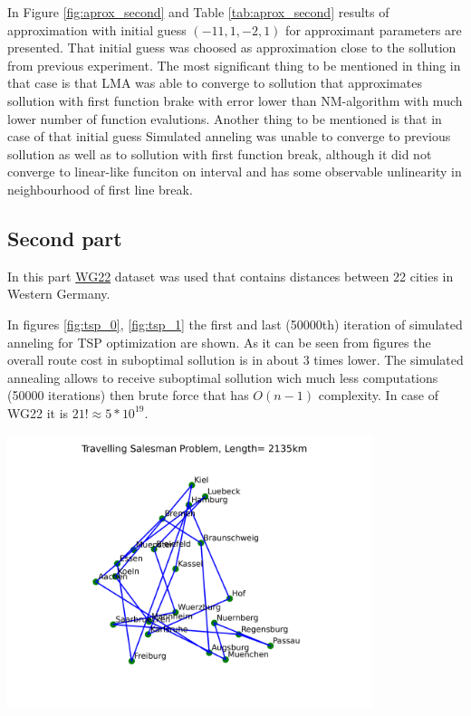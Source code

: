 In Figure \ref{fig:aprox_second} and Table \ref{tab:aprox_second} results of approximation with initial guess $(-11, 1, -2, 1)$ for approximant parameters are presented. 
That initial guess was choosed as approximation close to the sollution from previous experiment. The most significant thing to be mentioned in thing in that case is
that LMA was able to converge to sollution that approximates sollution with first function brake with error lower than NM-algorithm with much lower number of function evalutions.
Another thing to be mentioned is that in case of that initial guess Simulated anneling was unable to converge to previous sollution as well as to sollution with first function break, although
it did not converge to linear-like funciton on interval and has some observable unlinearity in neighbourhood of first line break.

\subsection*{Second part}

In this part \href{https://people.sc.fsu.edu/~jburkardt/datasets/cities/wg22_dist.txt}{WG22} dataset was used that contains distances between 22 cities in Western Germany.

In figures \ref{fig:tsp_0}, \ref{fig:tsp_1} the first and last (50000th) iteration of simulated anneling for TSP optimization are shown.
As it can be seen from figures the overall route cost in suboptimal sollution is in about 3 times lower. The simulated annealing allows to receive suboptimal
sollution wich much less computations (50000 iterations) then brute force that has $O(n - 1)$ complexity. In case of WG22 it is $21! \approx 5 * 10^{19}$.

\begin{center}
    \includegraphics[width=0.80\textwidth]{../results/tsp_0.png}
    \label{fig:tsp_0}
\end{center}

